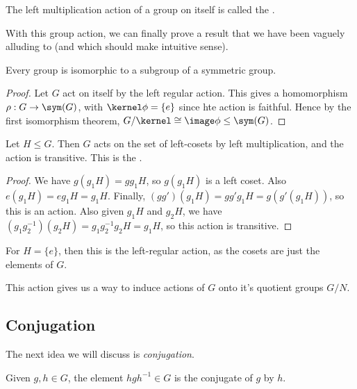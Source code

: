 \documentclass[a4]{scrreprt}
\begin{document}
\begin{definition}
	The left multiplication action of a group on itself is called the .
\end{definition}

With this group action, we can finally prove a result that we have been vaguely alluding to (and which should make intuitive sense).

\begin{theorem}
	Every group is isomorphic to a subgroup of a symmetric group. 
\end{theorem}
\begin{proof}
	Let $G$ act on itself by the left regular action. This gives a homomorphism $\rho: G \rightarrow \sym(G)$,
	with $\kernel \phi = \{e\}$ since hte action is faithful. Hence by the first isomorphism theorem, $G/\kernel \cong \image\phi \leq \sym(G)$.
\end{proof}

\begin{proposition}
	Let $H \leq G$. Then $G$ acts on the set of left-cosets by left multiplication, and the action is transitive. This is the .
\end{proposition}
\begin{proof}
	We have $g(g_1H) = gg_1 H$, so $g(g_1H)$ is a left coset. Also $e(g_1H) = e g_1 H = g_1 H$. Finally, $(gg')(g_1 H) = g g' g_1 H = g(g'(g_1 H))$, so this is an action. Also given $g_1 H$ and $g_2 H$, we have $(g_1 g_2^{-1})(g_2 H) = g_1 g_2^{-1} g_2 H = g_1 H$, so this action is transitive.
\end{proof}
\begin{remark}
	For $H = \{e\}$, then this is the left-regular action, as the cosets are just the elements of $G$.
\end{remark}
This action gives us a way to induce actions of $G$ onto it's quotient groups $G/N$.

\subsection{Conjugation}

The next idea we will discuss is \emph{conjugation}.

\begin{definition}[Conugation]
	Given $g, h \in G$, the element $h g h^{-1} \in G$ is the conjugate of $g$ by $h$.
\end{definition}
\end{document}
